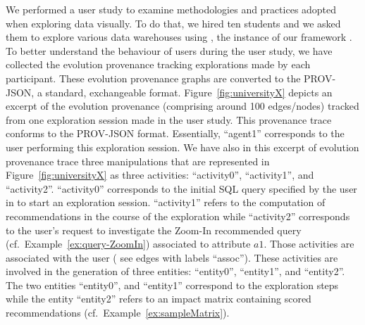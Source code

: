 \begin{example}
  \label{par:example}
We performed a user study to examine methodologies and practices adopted when exploring data visually.
To do that, we hired ten students and we asked them to explore various data warehouses using \prototype{}, the instance of our framework \framework{}.
 To better understand the behaviour of users during the user study, we have collected the evolution provenance tracking explorations made by each participant. 
 These evolution provenance graphs are converted to the PROV-JSON, a standard, exchangeable format. 
 Figure~\ref{fig:universityX} depicts an excerpt of the evolution provenance (comprising around 100 edges/nodes) tracked from one exploration session made in the user study. This provenance trace conforms to the PROV-JSON format. 
 Essentially, ``agent1'' corresponds to the user performing this exploration session. We have also in this excerpt of evolution provenance trace three manipulations that are represented in Figure~\ref{fig:universityX} as three activities:  ``activity0'', ``activity1'', and ``activity2''.
``activity0'' corresponds to the initial SQL query specified by the user in \prototype{} to start an exploration session. ``activity1'' refers to the computation of recommendations in the course of the exploration while ``activity2'' corresponds to the user's request to investigate the Zoom-In recommended query (cf.~Example~\ref{ex:query-ZoomIn}) associated to attribute $a1$.
 Those activities are associated with the user ( see edges with labels ``assoc'').
 These activities are involved in the generation of three entities: ``entity0'', ``entity1'', and ``entity2''. 
 The two entities  ``entity0'', and ``entity1'' correspond to the exploration steps while the entity ``entity2'' refers to an impact matrix containing scored recommendations (cf.~Example~\ref{ex:sampleMatrix}).
 \end{example}
